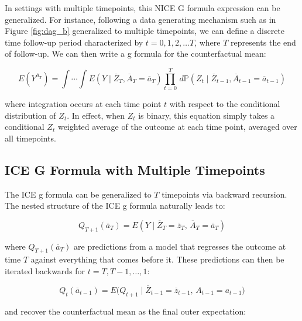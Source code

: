 \documentclass[12pt]{article}
\numberwithin{equation}{section}
\begin{document}
In settings with multiple timepoints, this NICE G formula expression can be generalized. For instance, following a data generating mechanism such as in Figure \ref{fig:dag_b} generalized to multiple timepoints, we can define a discrete time follow-up period characterized by $t = 0, 1, 2, \ldots T$, where $T$ represents the end of follow-up. We can then write a g formula for the counterfactual mean:  

\begin{equation}
E(Y^{\overline{a}_T}) = \int \cdots \int E(Y \mid \overline{Z}_T, \overline{A}_T = \overline{a}_T)\prod_{t = 0}^T \,d\mathbb{P}(Z_t\mid \overline{Z}_{t-1}, \overline{A}_{t-1} = \overline{a}_{t-1})
\end{equation}

\noindent where integration occurs at each time point $t$ with respect to the conditional distribution of $Z_t$. In effect, when $Z_t$ is binary, this equation simply takes a conditional $Z_t$ weighted average of the outcome at each time point, averaged over all timepoints. %

\subsection{ICE G Formula with Multiple Timepoints}

The ICE g formula can be generalized to $T$ timepoints via backward recursion. The nested structure of the ICE g formula naturally leads to:

\begin{equation}
Q_{T+1}(\overline{a}_T) = E(Y \mid \overline{Z}_T = \overline{z}_T,\, \overline{A}_T = \overline{a}_T)
\end{equation}

\noindent where $Q_{T+1}(\overline{a}_T)$ are predictions from a model that regresses the outcome at time $T$ against everything that comes before it. These predictions can then be iterated backwards for $t = T, T-1, \ldots, 1$:

\begin{equation}
Q_t(\overline{a}_{t-1}) = E\bigl(Q_{t+1} \mid \overline{Z}_{t-1}=\overline{z}_{t-1},\, A_{t-1}=a_{t-1}\bigr)
\end{equation}

\noindent and recover the counterfactual mean as the final outer expectation:
\end{document}
